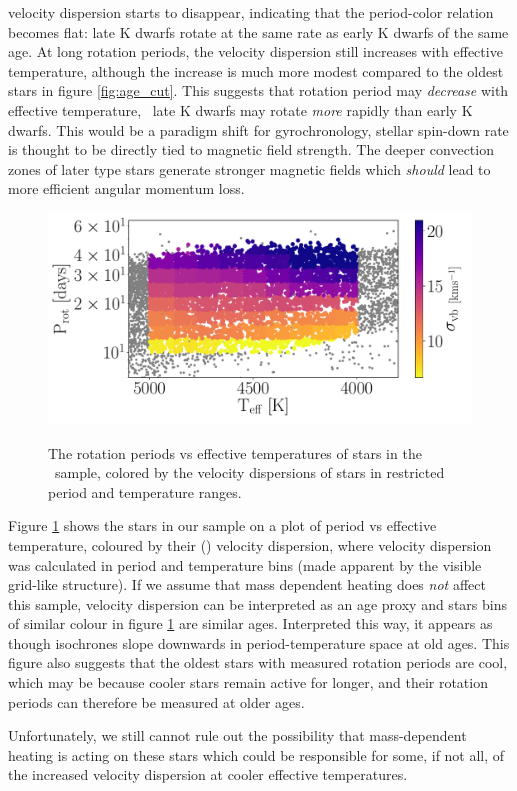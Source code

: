 velocity dispersion starts to disappear, indicating that the period-color
relation becomes flat: late K dwarfs rotate at the same rate as early K dwarfs
of the same age.
At long rotation periods, the velocity dispersion still increases with
effective temperature, although the increase is much more modest compared to
the oldest stars in figure \ref{fig:age_cut}.
This suggests that rotation period may {\it decrease} with effective
temperature, \ie\ late K dwarfs may rotate {\it more} rapidly than early K
dwarfs.
This would be a paradigm shift for gyrochronology, stellar spin-down rate is
thought to be directly tied to magnetic field strength.
The deeper convection zones of later type stars generate stronger magnetic
fields which {\it should} lead to more efficient angular momentum loss.

\begin{figure}
  \caption{
The rotation periods vs effective temperatures of stars in the \mct\ sample,
    colored by the velocity dispersions of stars in restricted period and
    temperature ranges.
}
  \centering
    \includegraphics[width=1\textwidth]{dispersion_period_teff}
\label{fig:dispersion_period_teff}
\end{figure}

Figure \ref{fig:dispersion_period_teff} shows the stars in our sample on a
plot of period vs effective temperature, coloured by their (\vb) velocity
dispersion, where velocity dispersion was calculated in period and temperature
bins (made apparent by the visible grid-like structure).
If we assume that mass dependent heating does {\it not} affect this sample,
velocity dispersion can be interpreted as an age proxy and stars bins of
similar colour in figure \ref{fig:dispersion_period_teff} are similar ages.
Interpreted this way, it appears as though isochrones slope downwards in
period-temperature space at old ages.
This figure also suggests that the oldest stars with measured rotation periods
are cool, which may be because cooler stars remain active for longer, and
their rotation periods can therefore be measured at older ages.

Unfortunately, we still cannot rule out the possibility that mass-dependent
heating is acting on these stars which could be responsible for some, if not
all, of the increased velocity dispersion at cooler effective temperatures.
